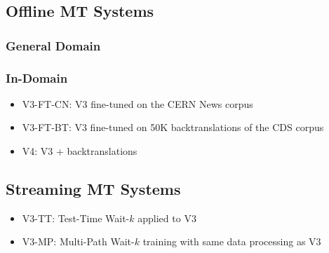 \documentclass[landscape]{article}
\begin{document}
\subsection*{Offline MT Systems}
\subsubsection*{General Domain}
\begin{table}[!htp]
\centering
{}
\end{table}
\vspace*{-15mm}
\subsubsection*{In-Domain}
\begin{itemize}
	\item V3-FT-CN: V3 fine-tuned on the CERN News corpus
	\item V3-FT-BT: V3 fine-tuned on 50K backtranslations of the CDS corpus
	\item V4: V3 + backtranslations
\end{itemize}
\vspace*{-10mm}
\subsection*{Streaming MT Systems}
\begin{itemize}
	\item V3-TT: Test-Time Wait-$k$ applied to V3
	\item V3-MP: Multi-Path Wait-$k$ training with same data processing as V3
\end{itemize}
\end{document}
